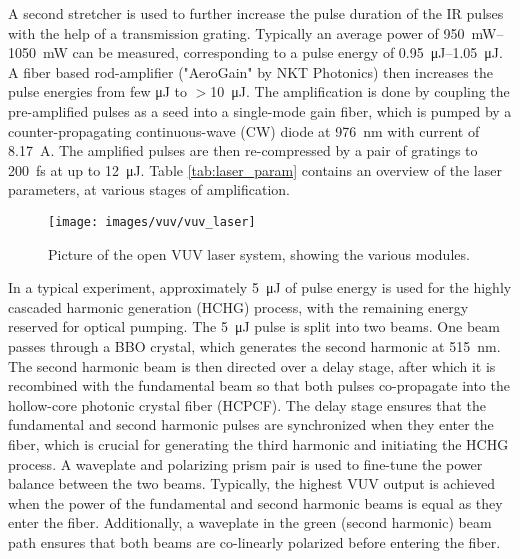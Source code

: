 A second stretcher is used to further increase the pulse duration of the IR pulses with the help of a transmission grating.
Typically an average power of \qtyrange{950}{1050}{\milli\watt} can be measured, corresponding to a pulse energy of \qtyrange{0.95}{1.05}{\micro\joule}.
A fiber based rod-amplifier ("AeroGain" by NKT Photonics) then increases the pulse energies from few \unit{\micro\joule} to $>$\qty{10}{\micro\joule}.
The amplification is done by coupling the pre-amplified pulses as a seed into a single-mode gain fiber, which is pumped by a counter-propagating continuous-wave (CW) diode at \qty{976}{\nano\meter} with current of \qty{8.17}{\ampere}.
The amplified pulses are then re-compressed by a pair of gratings to \qty{200}{\femto\second} at up to \qty{12}{\micro\joule}.
Table \ref{tab:laser_param} contains an overview of the laser parameters, at various stages of amplification.

\begin{figure}
	\centering
	\texttt{[image: images/vuv/vuv\_laser]}
	\caption{Picture of the open VUV laser system, showing the various modules.}
	\label{fig:vuvlaser}
\end{figure}

In a typical experiment, approximately \qty{5}{\micro\joule} of pulse energy is used for the highly cascaded harmonic generation (HCHG) process, with the remaining energy reserved for optical pumping.
The \qty{5}{\micro\joule} pulse is split into two beams.
One beam passes through a BBO crystal, which generates the second harmonic at \qty{515}{\nano\meter}.
The second harmonic beam is then directed over a delay stage, after which it is recombined with the fundamental beam so that both pulses co-propagate into the hollow-core photonic crystal fiber (HCPCF).
The delay stage ensures that the fundamental and second harmonic pulses are synchronized when they enter the fiber, which is crucial for generating the third harmonic and initiating the HCHG process.
A waveplate and polarizing prism pair is used to fine-tune the power balance between the two beams.
Typically, the highest VUV output is achieved when the power of the fundamental and second harmonic beams is equal as they enter the fiber.
Additionally, a waveplate in the green (second harmonic) beam path ensures that both beams are co-linearly polarized before entering the fiber.

